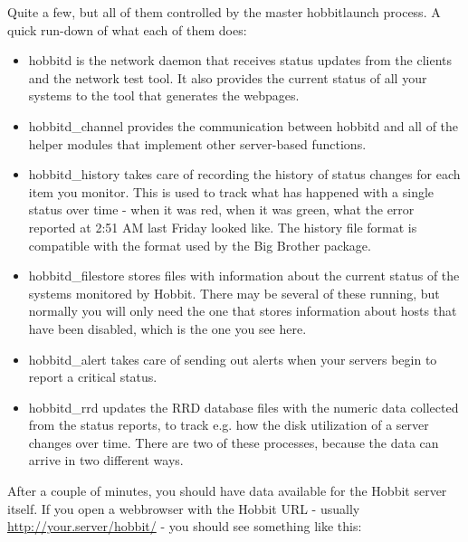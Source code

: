  Quite a few, but all of them controlled by the master hobbitlaunch
 process. A quick run-down of what each of them does:

\begin{itemize}
\item hobbitd is the network daemon that receives status updates from
  the clients and the network test tool. It also provides the current
  status of all your systems to the tool that generates the webpages.

\item hobbitd\_channel provides the communication between hobbitd and
  all of the helper modules that implement other server-based
  functions.

\item hobbitd\_history takes care of recording the history of status
  changes for each item you monitor. This is used to track what has
  happened with a single status over time - when it was red, when it
  was green, what the error reported at 2:51 AM last Friday looked
  like. The history file format is compatible with the format used by
  the Big Brother package.

\item hobbitd\_filestore stores files with information about the
  current status of the systems monitored by Hobbit. There may be
  several of these running, but normally you will only need the one
  that stores information about hosts that have been disabled, which
  is the one you see here.

\item hobbitd\_alert takes care of sending out alerts when your
  servers begin to report a critical status.

\item hobbitd\_rrd updates the RRD database files with the numeric
  data collected from the status reports, to track e.g. how the disk
  utilization of a server changes over time. There are two of these
  processes, because the data can arrive in two different ways.


\end{itemize}


 After a couple of minutes, you should have data available for the
 Hobbit server itself. If you open a webbrowser with the Hobbit URL -
 usually \url{http://your.server/hobbit/} - you should see something
 like this:

